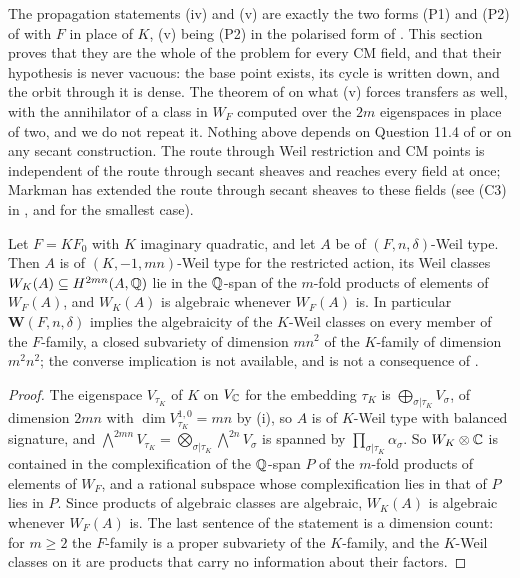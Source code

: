 \begin{remark}\label{rem:cmwhatisnew}
The propagation statements (iv) and (v) are exactly the two forms (P1) and
(P2) of  with $F$ in place of $K$, (v) being (P2) in the
polarised form of . This section proves that they are the
whole of the problem for every CM field, and that their hypothesis is never
vacuous: the base point exists, its cycle is written down, and the orbit
through it is dense. The theorem of  on what (v) forces
transfers as well, with the annihilator of a class in $W_{F}$ computed over
the $2m$ eigenspaces in place of two, and we do not repeat it. Nothing above
depends on Question 11.4 of \cite{Mar25b} or on any secant construction. The
route through Weil restriction and CM points is independent of the route
through secant sheaves and reaches every field at once; Markman has extended
the route through secant sheaves to these fields \cite{Mar25c} (see (C3) in
, and  for the smallest case).
\end{remark}

\begin{proposition}\label{prop:composite}
Let $F=KF_{0}$ with $K$ imaginary quadratic, and let $A$ be of
$(F,n,\delta)$-Weil type. Then $A$ is of $(K,-1,mn)$-Weil type for the
restricted action, its Weil classes $W_{K}(A)\subseteq H^{2mn}(A,\mathbb{Q})$ lie in
the $\mathbb{Q}$-span of the $m$-fold products of elements of $W_{F}(A)$, and
$W_{K}(A)$ is algebraic whenever $W_{F}(A)$ is. In particular
$\mathbf{W}(F,n,\delta)$ implies the algebraicity of the $K$-Weil classes on
every member of the $F$-family, a closed subvariety of dimension $mn^{2}$ of
the $K$-family of dimension $m^{2}n^{2}$; the converse implication is not
available, and  is not a consequence of
.
\end{proposition}

\begin{proof}
The eigenspace $V_{\tau_{K}}$ of $K$ on $V_{\mathbb{C}}$ for the embedding
$\tau_{K}$ is $\bigoplus_{\sigma|\tau_{K}}V_{\sigma}$, of dimension $2mn$
with $\dim V_{\tau_{K}}^{1,0}=mn$ by (i), so $A$ is of
$K$-Weil type with balanced signature, and
$\bigwedge^{2mn}V_{\tau_{K}}=\bigotimes_{\sigma|\tau_{K}}\bigwedge^{2n}V_{\sigma}$
is spanned by $\prod_{\sigma|\tau_{K}}\alpha_{\sigma}$. So
$W_{K}\otimes\mathbb{C}$ is contained in the complexification of the $\mathbb{Q}$-span $P$ of
the $m$-fold products of elements of $W_{F}$, and a rational subspace whose
complexification lies in that of $P$ lies in $P$. Since products of
algebraic classes are algebraic, $W_{K}(A)$ is algebraic whenever $W_{F}(A)$
is. The last sentence of the statement is a dimension count:
for $m\ge2$ the $F$-family is a proper subvariety of the $K$-family, and the
$K$-Weil classes on it are products that carry no information about their
factors.
\end{proof}

